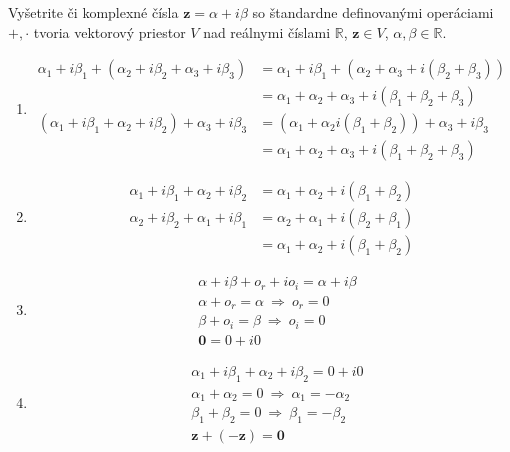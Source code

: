 \documentclass[a4paper, 10pt, ]{article}
\begin{document}
\begin{example}
    Vyšetrite či komplexné čísla $\bm{z} = \alpha + i \beta$ so štandardne definovanými operáciami $+, \cdot$ tvoria vektorový priestor $V$ nad reálnymi číslami $\mathbb{R}$, $\bm{z} \in V$, $\alpha, \beta \in \mathbb{R}$.

    \begin{enumerate}
        \item
        \begin{align*}
            \alpha_1 + i \beta_1 + (\alpha_2 + i \beta_2 + \alpha_3 + i \beta_3) &= 
            \alpha_1 + i \beta_1 + (\alpha_2 + \alpha_3 + i (\beta_2 + \beta_3)) \\ &= 
            \alpha_1 + \alpha_2 + \alpha_3 + i (\beta_1 + \beta_2 + \beta_3) \\ 
            (\alpha_1 + i \beta_1 + \alpha_2 + i \beta_2) + \alpha_3 + i \beta_3 &= 
            (\alpha_1 + \alpha_2 i (\beta_1 + \beta_2)) + \alpha_3 + i\beta_3 \\ &= 
            \alpha_1 + \alpha_2 + \alpha_3 + i (\beta_1 + \beta_2 + \beta_3) 
        \end{align*}
        
        \item
        \begin{align*}
            \alpha_1 + i \beta_1 + \alpha_2 + i \beta_2 &= 
            \alpha_1 + \alpha_2 + i (\beta_1 + \beta_2) \\ 
            \alpha_2 + i \beta_2 + \alpha_1 + i \beta_1&= 
            \alpha_2 + \alpha_1 + i (\beta_2 + \beta_1) \\ &= 
            \alpha_1 + \alpha_2 + i (\beta_1 + \beta_2) 
        \end{align*}

        \item
        \begin{align*}
            &\alpha + i \beta + o_r + i o_i = 
            \alpha + i \beta \\ 
            &\alpha + o_r = \alpha \ \Longrightarrow \ o_r = 0 \\
            &\beta + o_i = \beta \ \Longrightarrow \ o_i = 0 \\
            & \bm{0} = 0 + i0 
        \end{align*}

        \item
        \begin{align*}
            &\alpha_1 + i \beta_1 + \alpha_2 + i\beta_2 = 0 + i0 \\
            &\alpha_1 + \alpha_2 = 0 \ \Longrightarrow \ \alpha_1 = -\alpha_2 \\
            &\beta_1 + \beta_2 = 0 \ \Longrightarrow \ \beta_1 = -\beta_2 \\
            & \bm{z} + (-\bm{z}) = \bm{0} 
        \end{align*}


\end{enumerate}
\end{example}
\end{document}
